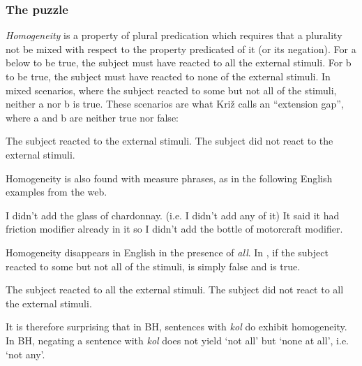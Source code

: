 \documentclass[output=paper]{langsci/langscibook}
\begin{document}
\subsubsection{The puzzle}%

\textit{Homogeneity} is a property of plural predication which requires that a plurality not be mixed with respect to the property predicated of it (or its negation). For a below to be true, the subject must have reacted to all the external stimuli. For b to be true, the subject must have reacted to none of the external stimuli. In mixed scenarios, where the subject reacted to some but not all of the stimuli, neither a nor b is true. These scenarios are what Križ calls an “extension gap”, where a and b are neither true nor false: 

\ea%
    \label{ex:doron:26}
\ea The subject reacted to the external stimuli.
\ex The subject did not react to the external stimuli.
\z
\z

Homogeneity is also found with measure phrases, as in the following English examples from the web. 

\ea%
    \label{ex:doron:27}
    \ea I didn't add the glass of chardonnay.   (i.e. I didn’t add any of it)
    \ex It said it had friction modifier already in it so I didn't add the bottle of motorcraft modifier.
\z
\z

Homogeneity disappears in English in the presence of \textit{all}. In , if the subject reacted to some but not all of the stimuli,  is simply false and  is true. 

\ea%
    \label{ex:doron:28}
    \ea The subject reacted to all the external stimuli.
    \ex The subject did not react to all the external stimuli.
\z
\z

It is therefore surprising that in BH, sentences with \textit{kol} do exhibit homogeneity. In BH, negating a sentence with \textit{kol} does not yield ‘not all’ but ‘none at all’, i.e. ‘not any’. 
\end{document}
